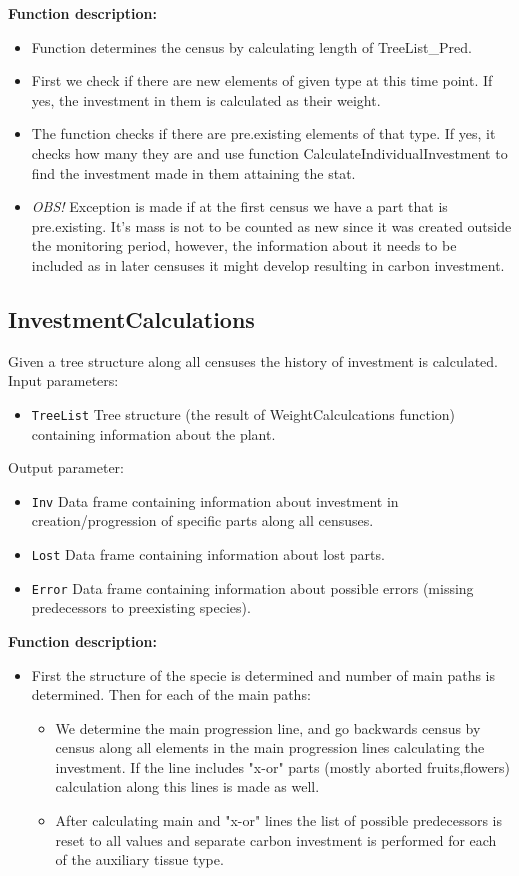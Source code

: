 \documentclass[10pt]{book} %
\begin{document}
\noindent \textbf{Function description:}
\begin{itemize}
\item Function determines the census by calculating length of TreeList\_Pred.
\item First we check if there are new elements of given type at this time point. If yes, the investment in them is calculated as their weight.
\item The function checks if there are pre.existing elements of that type. If yes, it checks how many they are and use function CalculateIndividualInvestment to find the investment made in them attaining the stat.
\item \textit{OBS!} Exception is made if at the first census we have a part that is pre.existing. It's mass is not to be counted as new since it was created outside the monitoring period, however, the information about it needs to be included as in later censuses it might develop resulting in carbon investment.
\end{itemize}

\subsection*{InvestmentCalculations}
Given a tree structure along all censuses the history of investment is calculated.
Input parameters:
\begin{itemize}
\item \texttt{TreeList}  Tree structure (the result of WeightCalculcations function) containing information about the plant.
\end{itemize}
Output parameter:
\begin{itemize}
\item \texttt{Inv} Data frame containing information about investment in creation/progression of specific parts along all censuses.
\item \texttt{Lost} Data frame containing information about lost parts.
\item \texttt{Error} Data frame containing information about possible errors (missing predecessors to preexisting species).
\end{itemize}

\noindent \textbf{Function description:}
\begin{itemize}
\item First the structure of the specie is determined and number of main paths is determined. Then for each of the main paths:
\begin{itemize}
\item We determine the main progression line, and go backwards census by census along all elements in the main progression lines calculating the investment.
If the line includes "x-or" parts (mostly aborted fruits,flowers) calculation  along this lines is made as well.
\item After calculating main and "x-or" lines the list of possible predecessors is reset to all values and separate carbon investment is performed for each of the auxiliary tissue type.
\end{itemize}
\end{itemize}
\end{document}
